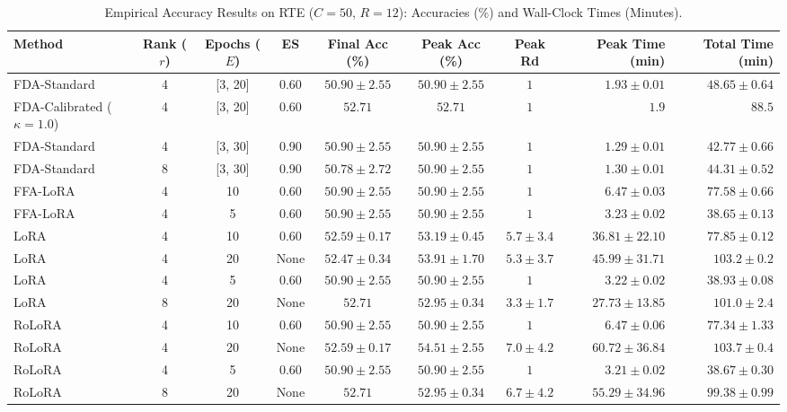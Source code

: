 \documentclass[10pt,a4paper]{article}
\begin{document}
\begin{table}[H]
\centering
\caption{Empirical Accuracy Results on RTE ($C=50$, $R=12$): Accuracies (\%) and Wall-Clock Times (Minutes).}
\scriptsize
\setlength{\tabcolsep}{3.5pt}
\begin{tabular*}{\textwidth}{@{\extracolsep{\fill}}lccccccrr@{}}
\toprule
\textbf{Method} & \textbf{Rank ($r$)} & \textbf{Epochs ($E$)} & \textbf{ES} & \textbf{Final Acc (\%)} & \textbf{Peak Acc (\%)} & \textbf{Peak Rd} & \textbf{Peak Time (min)} & \textbf{Total Time (min)} \\
\midrule
FDA-Standard & 4 & [3, 20] & 0.60 & $50.90 \pm 2.55$ & $50.90 \pm 2.55$ & $1$ & $1.93 \pm 0.01$ & $48.65 \pm 0.64$ \\
FDA-Calibrated ($\kappa=1.0$) & 4 & [3, 20] & 0.60 & $52.71$ & $52.71$ & $1$ & $1.9$ & $88.5$ \\
FDA-Standard & 4 & [3, 30] & 0.90 & $50.90 \pm 2.55$ & $50.90 \pm 2.55$ & $1$ & $\mathbf{1.29 \pm 0.01}$ & $42.77 \pm 0.66$ \\
FDA-Standard & 8 & [3, 30] & 0.90 & $50.78 \pm 2.72$ & $50.90 \pm 2.55$ & $1$ & $1.30 \pm 0.01$ & $44.31 \pm 0.52$ \\
FFA-LoRA & 4 & 10 & 0.60 & $50.90 \pm 2.55$ & $50.90 \pm 2.55$ & $1$ & $6.47 \pm 0.03$ & $77.58 \pm 0.66$ \\
FFA-LoRA & 4 & 5 & 0.60 & $50.90 \pm 2.55$ & $50.90 \pm 2.55$ & $1$ & $3.23 \pm 0.02$ & $38.65 \pm 0.13$ \\
LoRA & 4 & 10 & 0.60 & $52.59 \pm 0.17$ & $53.19 \pm 0.45$ & $5.7 \pm 3.4$ & $36.81 \pm 22.10$ & $77.85 \pm 0.12$ \\
LoRA & 4 & 20 & None & $52.47 \pm 0.34$ & $53.91 \pm 1.70$ & $5.3 \pm 3.7$ & $45.99 \pm 31.71$ & $103.2 \pm 0.2$ \\
LoRA & 4 & 5 & 0.60 & $50.90 \pm 2.55$ & $50.90 \pm 2.55$ & $1$ & $3.22 \pm 0.02$ & $38.93 \pm 0.08$ \\
LoRA & 8 & 20 & None & $\mathbf{52.71}$ & $52.95 \pm 0.34$ & $3.3 \pm 1.7$ & $27.73 \pm 13.85$ & $101.0 \pm 2.4$ \\
RoLoRA & 4 & 10 & 0.60 & $50.90 \pm 2.55$ & $50.90 \pm 2.55$ & $1$ & $6.47 \pm 0.06$ & $77.34 \pm 1.33$ \\
RoLoRA & 4 & 20 & None & $52.59 \pm 0.17$ & $\mathbf{54.51 \pm 2.55}$ & $7.0 \pm 4.2$ & $60.72 \pm 36.84$ & $103.7 \pm 0.4$ \\
RoLoRA & 4 & 5 & 0.60 & $50.90 \pm 2.55$ & $50.90 \pm 2.55$ & $1$ & $3.21 \pm 0.02$ & $38.67 \pm 0.30$ \\
RoLoRA & 8 & 20 & None & $\mathbf{52.71}$ & $52.95 \pm 0.34$ & $6.7 \pm 4.2$ & $55.29 \pm 34.96$ & $99.38 \pm 0.99$ \\
\bottomrule
\end{tabular*}
\end{table}
\end{document}
